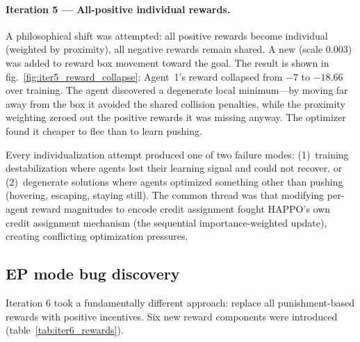 \paragraph{Iteration 5 --- All-positive individual rewards.}
A philosophical shift was attempted: all positive rewards become individual (weighted by proximity), all negative rewards remain shared. A new  (scale 0.003) was added to reward box movement toward the goal. The result is shown in fig.~\ref{fig:iter5_reward_collapse}: Agent~1's reward collapsed from $-7$ to $-18.66$ over training. The agent discovered a degenerate local minimum---by moving far away from the box it avoided the shared collision penalties, while the proximity weighting zeroed out the positive rewards it was missing anyway. The optimizer found it cheaper to flee than to learn pushing.


Every individualization attempt produced one of two failure modes: (1)~training destabilization where agents lost their learning signal and could not recover, or (2)~degenerate solutions where agents optimized something other than pushing (hovering, escaping, staying still). The common thread was that modifying per-agent reward magnitudes to encode credit assignment fought HAPPO's own credit assignment mechanism (the sequential importance-weighted update), creating conflicting optimization pressures.

\subsection{EP mode bug discovery}
\label{sec:ep_mode_bug}

Iteration 6 took a fundamentally different approach: replace all punishment-based rewards with positive incentives. Six new reward components were introduced (table~\ref{tab:iter6_rewards}).


